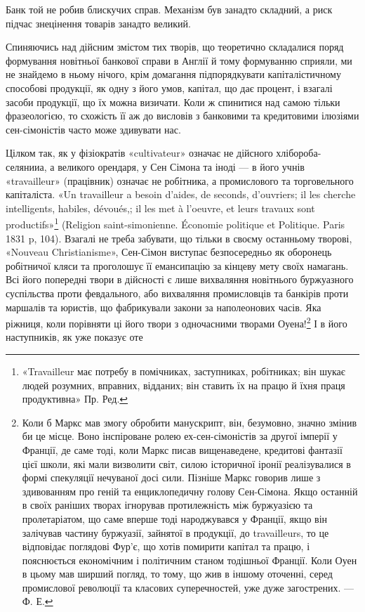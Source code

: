 \parcont{}  %
Банк той не робив блискучих справ. Механізм був занадто складний, а риск
підчас знецінення товарів занадто великий.

Спиняючись над дійсним змістом тих творів, що теоретично складалися
поряд формування новітньої банкової справи в Англії й тому формуванню
сприяли, ми не знайдемо в ньому нічого, крім домагання підпорядкувати
капіталістичному способові продукції, як одну з його умов, капітал, що дає процент,
і взагалі засоби продукції, що їх можна визичати. Коли ж спинитися над
самою тільки фразеологією, то схожість її аж до висловів з банковими та кредитовими
ілюзіями сен-сімоністів часто може здивувати нас.

Цілком так, як у фізіократів «cultivateur» означає не дійсного хлібороба-селянииа,
а великого орендаря, у Сен Сімона та іноді — в його учнів «travailleur»
(працівник) означає не робітника, а промислового та торговельного капіталіста.
«Un travailleur a besoin d’aides, de seconds, d'ouvriers; il les cherche
intelligents, habiles, dévoués,; il les met à l’oeuvre, et leurs travaux sont productifs»\footnote*{
«Travailleur має потребу в помічниках, заступниках, робітниках; він шукає людей розумних,
вправних, відданих; він ставить їх на працю й їхня праця продуктивна» Пр. Ред.
}
(Religion saint-simonienne. Économie politique et Politique. Paris 1831 p, 104). Взагалі
не треба забувати, що тільки в своєму останньому творові, «Nouveau Christianisme»,
Сен-Сімон виступає безпосередньо як оборонець робітничої кляси та
проголошує її емансипацію за кінцеву мету своїх намагань. Всі його попередні
твори в дійсності є лише вихваляння новітнього буржуазного суспільства проти
февдального, або вихваляння промисловців та банкірів проти маршалів та юристів,
що фабрикували закони за наполеонових часів. Яка ріжниця, коли порівняти ці його
твори з одночасними творами Оуена!\footnote{
Коли б Маркс мав змогу обробити манускрипт, він, безумовно, значно змінив би це місце.
Воно інспіроване ролею ех-сен-сімоністів за другої імперії у Франції, де саме тоді, коли Маркс
писав вищенаведене, кредитові фантазії цієї школи, які мали визволити світ, силою історичної
іронії реалізувалися в формі спекуляції нечуваної досі сили. Пізніше Маркс говорив лише з
здивованням
про геній та енциклопедичну голову Сен-Сімона. Якщо останній в своїх раніших творах ігнорував
протилежність між буржуазією та пролетаріатом, що саме вперше тоді народжувався у Франції,
якщо він залічував частину буржуазії, зайнятої в продукції, до travailleurs, то це відповідає
поглядові
Фур’є, що хотів помирити капітал та працю, і пояснюється економічним і політичним станом тодішньої
Франції. Коли Оуен в цьому мав ширший погляд, то тому, що жив в іншому оточенні, серед промислової
революції та класових суперечностей, уже дуже загострених. — Ф. Е.
} І в його наступників, як уже показує оте
